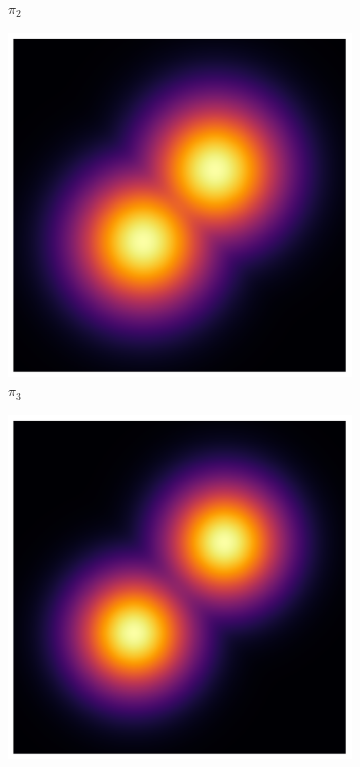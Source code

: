 \begin{figure}[t]
\begin{subfigure}{0.15\textwidth}
      \caption*{$\pi_2$}
    \end{subfigure}
    \begin{subfigure}{0.15\textwidth}
      \centering
      \includegraphics[width=\textwidth]{img/heatmap_path_3.pdf}
      \caption*{$\pi_3$}
    \end{subfigure}
    \begin{subfigure}{0.15\textwidth}
      \centering
      \includegraphics[width=\textwidth]{img/heatmap_path_4.pdf}

\end{subfigure}
\end{figure}
